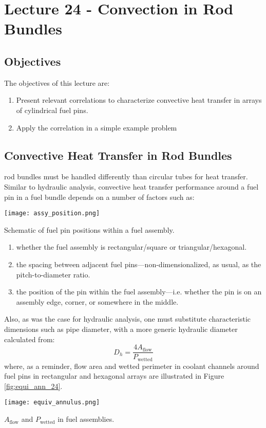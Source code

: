 \chapter{Lecture 24 - Convection in Rod Bundles}
\label{ch:ch24}
\section{Objectives}
The objectives of this lecture are:
\begin{enumerate}
\item Present relevant correlations to characterize convective heat transfer in arrays of cylindrical fuel pins.
\item Apply the correlation in a simple example problem
\end{enumerate}

\section{Convective Heat Transfer in Rod Bundles}

 rod bundles must be handled differently than circular tubes for heat transfer. Similar to hydraulic analysis, convective heat transfer performance around a fuel pin in a fuel bundle depends on a number of factors such as:

\begin{marginfigure}
\texttt{[image: assy\_position.png]}
\caption{Schematic of fuel pin positions within a fuel assembly.}
\end{marginfigure}

\begin{enumerate}
\item whether the fuel assembly is rectangular/square or triangular/hexagonal.  
\item the spacing between adjacent fuel pins---non-dimensionalized, as usual, as the pitch-to-diameter ratio.
\item the position of the pin within the fuel assembly---i.e. whether the pin is on an assembly edge, corner, or somewhere in the middle.
\end{enumerate} 


Also, as was the case for hydraulic analysis, one must substitute characteristic dimensions such as pipe diameter, with a more generic hydraulic diameter calculated from:
\begin{equation}
D_h = \frac{4 A_{\text{flow}}}{P_{\text{wetted}}}
\label{eq:hyd_diameter_24}
\end{equation}
where, as a reminder, flow area and wetted perimeter in coolant channels around fuel pins in rectangular and hexagonal arrays are illustrated in Figure \ref{fig:equi_ann_24}.
\begin{marginfigure}
\texttt{[image: equiv\_annulus.png]}
\caption{$A_{\text{flow}}$ and $P_{\text{wetted}}$ in fuel assemblies.}
\label{fig:equi_ann_24}
\end{marginfigure}


